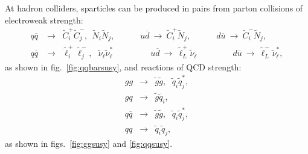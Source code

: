 \documentclass[12pt]{article}
\def\beq{\begin{eqnarray}}
\def\eeq{\end{eqnarray}}
\def\stilde{\widetilde}
\begin{document}
At hadron colliders, sparticles can be produced in pairs from parton 
collisions of electroweak strength:
\beq
q \overline q^{\phantom '}\! &\rightarrow & \stilde  
C_i^+ \stilde C_j^-, 
\>\>
\stilde N_i \stilde N_j,
\qquad\quad
u \overline d \>\rightarrow\>  \stilde C_i^+ \stilde N_j,
\qquad\quad
d \overline u \>\rightarrow\>  \stilde C_i^- \stilde N_j,
\label{eq:qqbarinos}
\\
q \overline q^{\phantom '}\! &\rightarrow & \stilde \ell^+_i \stilde \ell^-_j,
\>\>\>
\stilde \nu_\ell \stilde \nu^*_\ell
\qquad\qquad\>\>
u \overline d \>\rightarrow\>  \stilde \ell^+_L \stilde \nu_\ell
\qquad\qquad\>
d \overline u \>\rightarrow\>  \stilde \ell^-_L \stilde \nu^*_\ell,
\label{eq:qqbarsleptons}
\eeq
as shown in fig.~\ref{fig:qqbarsusy}, and reactions of QCD strength:
\beq
gg &\rightarrow & \stilde g \stilde g, 
\>\>\,
\stilde q_i \stilde q_j^*,
\label{eq:gluegluegluinos}
\\
gq &\rightarrow & \stilde g \stilde q_i,
\label{eq:gluequarkgluinosquark}
\\
q \overline q &\rightarrow& \stilde g \stilde g, 
\>\>\,
\stilde q_i \stilde q_j^*,
\label{eq:qqbargluinosorsquarks}
\\
q q &\rightarrow& \stilde q_i \stilde q_j,
\label{eq:qqsquarks}
\eeq
as shown in figs.~\ref{fig:ggsusy} and \ref{fig:qqsusy}.
\end{document}
